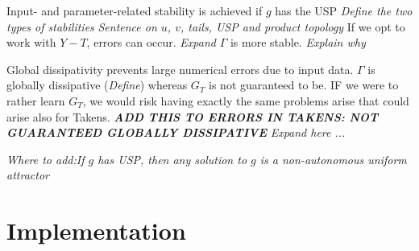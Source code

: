\documentclass[12 pt]{article}
\begin{document}
Input- and parameter-related stability is achieved if $g$ has the USP
\newline \emph{Define the two types of stabilities}
\newline \emph{Sentence on $u$, $v$, tails, USP and product topology}
\newline If we opt to work with $Y-T$, errors can occur. \emph{Expand}
\newline $\Gamma$ is more stable. \emph{Explain why}

Global dissipativity prevents large numerical errors due to input data. $\Gamma$ is globally dissipative (\emph{Define}) whereas $G_T$ is not guaranteed to be. IF we were to rather learn $G_T$, we would risk having exactly the same problems arise that could arise also for Takens. \textbf{\emph{ADD THIS TO ERRORS IN TAKENS: NOT GUARANTEED GLOBALLY DISSIPATIVE}}
\newline \emph{Expand here ...}

\emph{Where to add:If $g$ has USP, then any solution to $g$ is a non-autonomous uniform attractor}




\section{Implementation} \label{sect5}
 
 



\vspace{-1cm}


\end{document}
